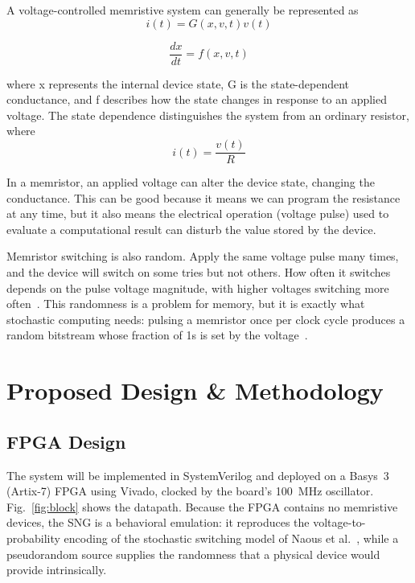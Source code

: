 \documentclass[conference]{IEEEtran}
\begin{document}
A voltage-controlled memristive system can generally be represented as
\begin{equation}
    i(t) = G(x,v,t)v(t)
\end{equation}

\begin{equation}
    \frac{dx}{dt} = f(x,v,t)
\end{equation}

where x represents the internal device state, G is the state-dependent conductance,
and f describes how the state changes in response to an applied voltage.
The state dependence distinguishes the system from an ordinary resistor, where
\begin{equation}
    i(t)=\frac{v(t)}{R}
\end{equation}

In a memristor, an applied voltage can alter the device state, changing the conductance.
This can be good because it means we can program the resistance at any time,
but it also means the electrical operation (voltage pulse) used to evaluate a 
computational result can disturb the value stored by the device.

Memristor switching is also random. Apply the same voltage pulse many times,
and the device will switch on some tries but not others. How often it
switches depends on the pulse voltage magnitude, with higher voltages switching more
often~\cite{memristor_stochasticity}. This randomness is a problem for
memory, but it is exactly what stochastic computing needs: pulsing a
memristor once per clock cycle produces a random bitstream whose fraction of
1s is set by the voltage~\cite{gaba2013stochastic}.

\section{Proposed Design \& Methodology}

\subsection{FPGA Design}
The system will be implemented in SystemVerilog and deployed on a Basys~3
(Artix-7) FPGA using Vivado, clocked by the board's 100~MHz oscillator.
Fig.~\ref{fig:block} shows the datapath. Because the FPGA contains no
memristive devices, the SNG is a behavioral emulation: it reproduces the
voltage-to-probability encoding of the stochastic switching model of Naous
et al.~\cite{memristor_stochasticity}, while a pseudorandom source supplies
the randomness that a physical device would provide intrinsically.
\end{document}
